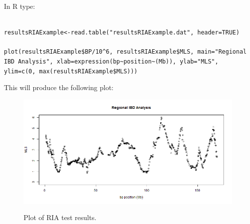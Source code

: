 \documentclass[a4paper,12pt]{article}
\begin{document}
In R type: 
\vspace{0.35cm} \begin{lstlisting}

resultsRIAExample<-read.table("resultsRIAExample.dat", header=TRUE)

plot(resultsRIAExample$BP/10^6, resultsRIAExample$MLS, main="Regional IBD Analysis", xlab=expression(bp~position~(Mb)), ylab="MLS", ylim=c(0, max(resultsRIAExample$MLS)))

\end{lstlisting} \vspace{0.35cm}
This will produce the following plot: 
{\begin{figure}[ht]
{\begin{center}
{\includegraphics[width=400pt]{exampleRIA.png}}
\caption{Plot of RIA test results.}
\label{example-fig}
\end{center}}
\end{figure}
}
\end{document}
